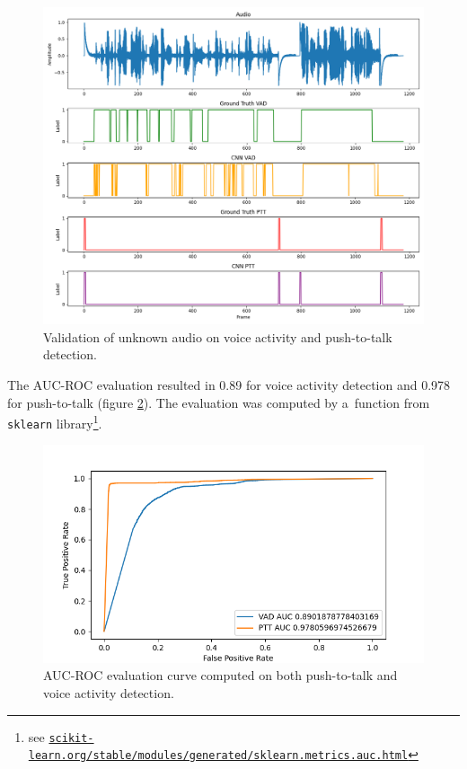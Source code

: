     \begin{figure}[ht!]
        \centering
        \includegraphics[width = \textwidth]{obrazky-figures/CNNOUTPUT_MTL.png}
        \caption{Validation of unknown audio on voice activity and push-to-talk detection.}
        \label{fig:validationCNNMLT}
    \end{figure}

    The AUC-ROC evaluation resulted in 0.89 for voice activity detection and 0.978 for push-to-talk (figure \ref{fig:ROCMLTCNN}). The evaluation was computed by a~function from \texttt{sklearn} library\footnote{see
    \href{scikit-learn.org/stable/modules/generated/sklearn.metrics.auc.html}{\texttt{scikit-learn.org/stable/modules/generated/sklearn.metrics.auc.html}}}.
    
    \begin{figure}[ht!]
        \centering
        \includegraphics[width = \textwidth]{obrazky-figures/ROCCNN.png}
        \caption{AUC-ROC evaluation curve computed on both push-to-talk and voice activity detection.}
        \label{fig:ROCMLTCNN}
    \end{figure}

